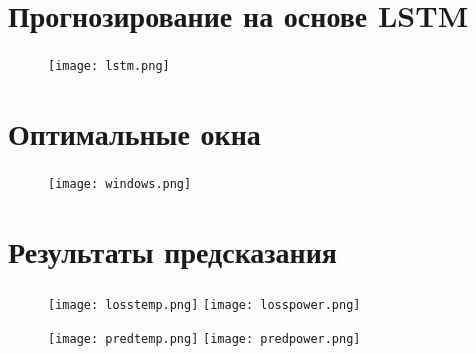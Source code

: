 \section{Прогнозирование на основе LSTM}

\begin{frame}
\frametitle{\insertsection}

\begin{figure}
    \center
    \texttt{[image: lstm.png]}
\end{figure}


\end{frame}



\section{Оптимальные окна}

\begin{frame}
\frametitle{\insertsection}

\vspace{\baselineskip}

\begin{figure}
    \center
    \texttt{[image: windows.png]}
\end{figure}

\end{frame}


\section{Результаты предсказания}

\begin{frame}
\frametitle{\insertsection}

\begin{figure}
    \center
    \texttt{[image: losstemp.png]}
    \texttt{[image: losspower.png]}
\end{figure}

\begin{figure}
    \center
    \texttt{[image: predtemp.png]}
    \texttt{[image: predpower.png]}
\end{figure}


\end{frame}

